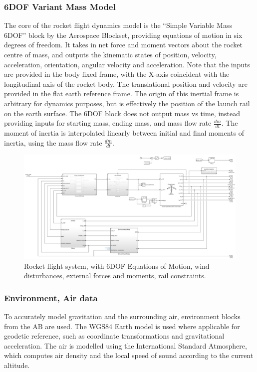 \subsubsection{6DOF Variant Mass Model}
The core of the rocket flight dynamics model is the ``Simple Variable Mass 6DOF'' block by the Aerospace Blockset, providing equations of motion in six degrees of freedom.
It takes in net force and moment vectors about the rocket centre of mass, and outputs the kinematic states of position, velocity, acceleration, orientation, angular velocity and acceleration.
Note that the inputs are provided in the body fixed frame, with the X-axis coincident with the longitudinal axis of the rocket body. The translational position and velocity are provided in the flat earth reference frame. The origin of this inertial frame is arbitrary for dynamics purposes, but is effectively the position of the launch rail on the earth surface.
The 6DOF block does not output mass vs time, instead providing inputs for starting mass, ending mass, and mass flow rate $\frac{dm}{dt}$. 
The moment of inertia is interpolated linearly between initial and final moments of inertia, using the mass flow rate $\frac{dm}{dt}$.

\begin{figure}[ht]
    \centering
    \includegraphics[width=0.9\linewidth]{images-plant/sim_rocket.png}
    \caption[Rocket flight system]{Rocket flight system, with 6DOF Equations of Motion, wind disturbances, external forces and moments, rail constraints.}
    \label{fig:rocket-flight}
\end{figure}


\subsubsection{Environment, Air data}
To accurately model gravitation and the surrounding air, environment blocks from the AB are used.
The WGS84 Earth model is used where applicable for geodetic reference, such as coordinate transformations and gravitational acceleration.
The air is modelled using the International Standard Atmosphere, which computes air density and the local speed of sound according to the current altitude.


